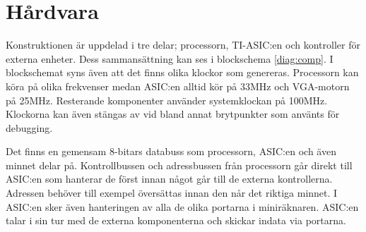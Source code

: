 \documentclass[main.tex]{subfiles}
\begin{document}
\section{Hårdvara}
Konstruktionen är uppdelad i tre delar; processorn, TI-ASIC:en och kontroller
för externa enheter. Dess sammansättning kan ses i blockschema \ref{diag:comp}.
I blockschemat syns även att det finns olika klockor som genereras. Processorn
kan köra på olika frekvenser medan ASIC:en alltid kör på 33MHz och VGA-motorn
på 25MHz. Resterande komponenter använder systemklockan på 100MHz. Klockorna
kan även stängas av vid bland annat brytpunkter som använts för debugging.

Det finns en gemensam 8-bitars databuss som processorn, ASIC:en och även minnet
delar på. Kontrollbussen och adressbussen från processorn går direkt till
ASIC:en som hanterar de först innan något går till de externa kontrollerna.
Adressen behöver till exempel översättas innan den når det riktiga minnet. I
ASIC:en sker även hanteringen av alla de olika portarna i miniräknaren. ASIC:en
talar i sin tur med de externa komponenterna och skickar indata via portarna.




\end{document}
